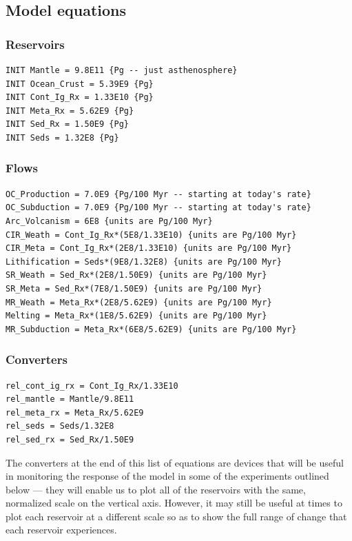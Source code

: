 \documentclass[11pt,letterpaper]{article}
\begin{document}
\subsection{Model equations}
\subsubsection{Reservoirs}
\begin{verbatim}
INIT Mantle = 9.8E11 {Pg -- just asthenosphere}
INIT Ocean_Crust = 5.39E9 {Pg}
INIT Cont_Ig_Rx = 1.33E10 {Pg}
INIT Meta_Rx = 5.62E9 {Pg}
INIT Sed_Rx = 1.50E9 {Pg}
INIT Seds = 1.32E8 {Pg}
\end{verbatim}

\subsubsection{Flows}
\begin{verbatim}
OC_Production = 7.0E9 {Pg/100 Myr -- starting at today's rate}
OC_Subduction = 7.0E9 {Pg/100 Myr -- starting at today's rate}
Arc_Volcanism = 6E8 {units are Pg/100 Myr}
CIR_Weath = Cont_Ig_Rx*(5E8/1.33E10) {units are Pg/100 Myr}
CIR_Meta = Cont_Ig_Rx*(2E8/1.33E10) {units are Pg/100 Myr}
Lithification = Seds*(9E8/1.32E8) {units are Pg/100 Myr}
SR_Weath = Sed_Rx*(2E8/1.50E9) {units are Pg/100 Myr}
SR_Meta = Sed_Rx*(7E8/1.50E9) {units are Pg/100 Myr}
MR_Weath = Meta_Rx*(2E8/5.62E9) {units are Pg/100 Myr}
Melting = Meta_Rx*(1E8/5.62E9) {units are Pg/100 Myr}
MR_Subduction = Meta_Rx*(6E8/5.62E9) {units are Pg/100 Myr}
\end{verbatim}

\subsubsection{Converters}
\begin{verbatim}
rel_cont_ig_rx = Cont_Ig_Rx/1.33E10
rel_mantle = Mantle/9.8E11
rel_meta_rx = Meta_Rx/5.62E9
rel_seds = Seds/1.32E8
rel_sed_rx = Sed_Rx/1.50E9
\end{verbatim}

The converters at the end of this list of equations are devices that will be useful in monitoring the response of the model in some of the experiments outlined below --- they will enable us to plot all of the reservoirs with the same, normalized scale on the vertical axis. However, it may still be useful at times to plot each reservoir at a different scale so as to show the full range of change that each reservoir experiences.
\end{document}
